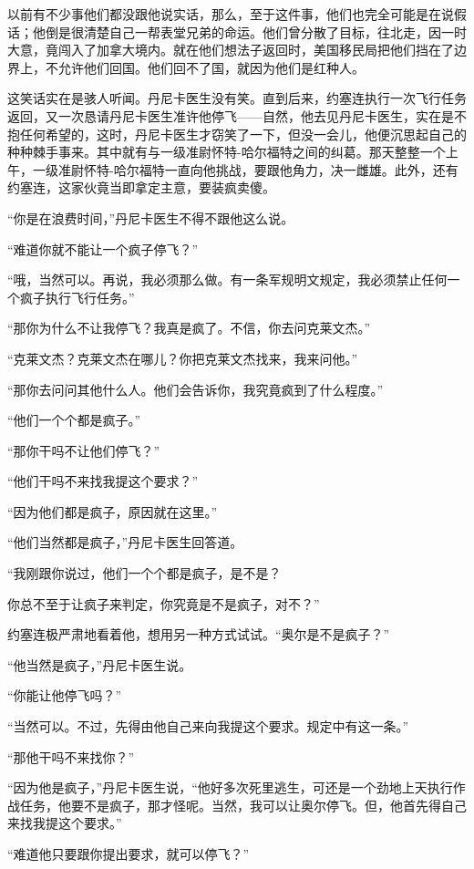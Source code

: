     以前有不少事他们都没跟他说实话，那么，至于这件事，他们也完全可能是在说假话；他倒是很清楚自己一帮表堂兄弟的命运。他们曾分散了目标，往北走，因一时大意，竟闯入了加拿大境内。就在他们想法子返回时，美国移民局把他们挡在了边界上，不允许他们回国。他们回不了国，就因为他们是红种人。

    这笑话实在是骇人听闻。丹尼卡医生没有笑。直到后来，约塞连执行一次飞行任务返回，又一次恳请丹尼卡医生准许他停飞——自然，他去见丹尼卡医生，实在是不抱任何希望的，这时，丹尼卡医生才窃笑了一下，但没一会儿，他便沉思起自己的种种棘手事来。其中就有与一级准尉怀特-哈尔福特之间的纠葛。那天整整一个上午，一级准尉怀特-哈尔福特一直向他挑战，要跟他角力，决一雌雄。此外，还有约塞连，这家伙竟当即拿定主意，要装疯卖傻。

    “你是在浪费时间，”丹尼卡医生不得不跟他这么说。

    “难道你就不能让一个疯子停飞？”

    “哦，当然可以。再说，我必须那么做。有一条军规明文规定，我必须禁止任何一个疯子执行飞行任务。”

    “那你为什么不让我停飞？我真是疯了。不信，你去问克莱文杰。”

    “克莱文杰？克莱文杰在哪儿？你把克莱文杰找来，我来问他。”

    “那你去问问其他什么人。他们会告诉你，我究竟疯到了什么程度。”

    “他们一个个都是疯子。”

    “那你干吗不让他们停飞？”

    “他们干吗不来找我提这个要求？”

    “因为他们都是疯子，原因就在这里。”

    “他们当然都是疯子，”丹尼卡医生回答道。

    “我刚跟你说过，他们一个个都是疯子，是不是？

    你总不至于让疯子来判定，你究竟是不是疯子，对不？”

    约塞连极严肃地看着他，想用另一种方式试试。“奥尔是不是疯子？”

    “他当然是疯子，”丹尼卡医生说。

    “你能让他停飞吗？”

    “当然可以。不过，先得由他自己来向我提这个要求。规定中有这一条。”

    “那他干吗不来找你？”

    “因为他是疯子，”丹尼卡医生说，“他好多次死里逃生，可还是一个劲地上天执行作战任务，他要不是疯子，那才怪呢。当然，我可以让奥尔停飞。但，他首先得自己来找我提这个要求。”

    “难道他只要跟你提出要求，就可以停飞？”

